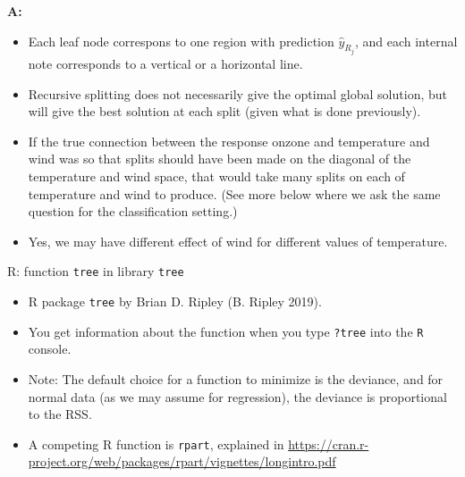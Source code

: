 \documentclass[10pt,ignorenonframetext,]{beamer}
\providecommand{\tightlist}{%
  \setlength{\itemsep}{0pt}\setlength{\parskip}{0pt}}
\begin{document}
\begin{frame}

\textbf{A:}

\begin{itemize}
\tightlist
\item
  Each leaf node correspons to one region with prediction
  \(\hat{y}_{R_j}\), and each internal note corresponds to a vertical or
  a horizontal line.
\item
  Recursive splitting does not necessarily give the optimal global
  solution, but will give the best solution at each split (given what is
  done previously).
\item
  If the true connection between the response onzone and temperature and
  wind was so that splits should have been made on the diagonal of the
  temperature and wind space, that would take many splits on each of
  temperature and wind to produce. (See more below where we ask the same
  question for the classification setting.)
\item
  Yes, we may have different effect of wind for different values of
  temperature.
\end{itemize}

\end{frame}

\begin{frame}[fragile]

\begin{block}{R: function \texttt{tree} in library \texttt{tree}}

\vspace{2mm}

\begin{itemize}
\item
  R package \texttt{tree} by Brian D. Ripley (B. Ripley 2019).
\item
  You get information about the function when you type \texttt{?tree}
  into the \texttt{R} console.
\item
  Note: The default choice for a function to minimize is the deviance,
  and for normal data (as we may assume for regression), the deviance is
  proportional to the RSS.
\end{itemize}

\begin{itemize}
\tightlist
\item
  A competing R function is \texttt{rpart}, explained in
  \url{https://cran.r-project.org/web/packages/rpart/vignettes/longintro.pdf}
\end{itemize}

\end{block}

\end{frame}
\end{document}
